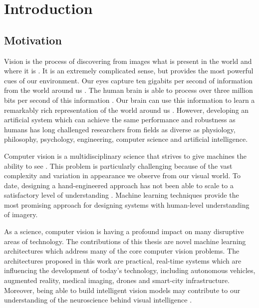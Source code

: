
\chapter{Introduction}  %

\graphicspath{{Chapter1/Figs/}}



\section{Motivation}

Vision is the process of discovering from images what is present in the world and where it is \citep{marr1982vision}. It is an extremely complicated sense, but provides the most powerful cues of our environment. Our eyes capture ten gigabits per second of information from the world around us \citep{anderson2005directed}. The human brain is able to process over three million bits per second of this information \citep{anderson2005directed}. Our brain can use this information to learn a remarkably rich representation of the world around us \citep{barlow1989unsupervised}. However, developing an artificial system which can achieve the same performance and robustness as humans has long challenged researchers from fields as diverse as physiology, philosophy, psychology, engineering, computer science and artificial intelligence.

Computer vision is a multidisciplinary science that strives to give machines the ability to see \citep{szeliski2010computer}. 
This problem is particularly challenging because of the vast complexity and variation in appearance we observe from our visual world. 
To date, designing a hand-engineered approach has not been able to scale to a satisfactory level of understanding \citep{roberts1963machine,papert1966summer}. 
Machine learning techniques \citep{bishop2006pattern} provide the most promising approach for designing systems with human-level understanding of imagery.

As a science, computer vision is having a profound impact on many disruptive areas of technology. The contributions of this thesis are novel machine learning architectures which address many of the core computer vision problems. The architectures proposed in this work are practical, real-time systems which are influencing the development of today’s technology, including autonomous vehicles, augmented reality, medical imaging, drones and smart-city infrastructure. Moreover, being able to build intelligent vision models may contribute to our understanding of the neuroscience behind visual intelligence \citep{sterling2015principles}.


